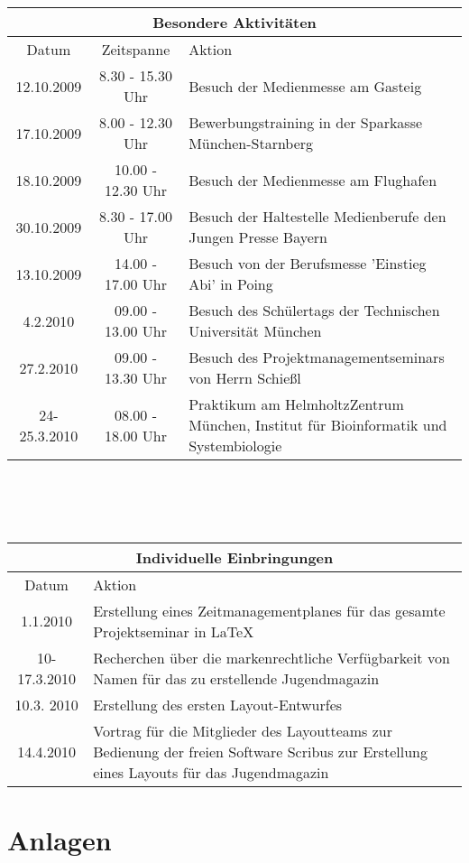 \documentclass[a4paper,12pt,twoside]{scrbook}
\begin{document}
\vspace{2cm}
\begin{tabular}{ccp{10cm}} \hline
\toprule
\multicolumn{3}{c}{\large Besondere Aktivitäten} \\\midrule
Datum & Zeitspanne & Aktion \\ \hline
12.10.2009 & 8.30 - 15.30 Uhr & Besuch der Medienmesse am Gasteig \\
17.10.2009 & 8.00 - 12.30 Uhr & Bewerbungstraining in der Sparkasse München-Starnberg \\
18.10.2009 & 10.00 - 12.30 Uhr & Besuch der Medienmesse am Flughafen\\ 
30.10.2009 & 8.30 - 17.00 Uhr & Besuch der Haltestelle Medienberufe den Jungen Presse Bayern \\
13.10.2009 & 14.00 - 17.00 Uhr & Besuch von der Berufsmesse 'Einstieg Abi' in Poing \\ 
4.2.2010 & 09.00 - 13.00 Uhr & Besuch des Schülertags der Technischen Universität München \\
27.2.2010 & 09.00 - 13.30 Uhr & Besuch des Projektmanagementseminars von Herrn Schießl\\
24-25.3.2010 & 08.00 - 18.00 Uhr & Praktikum am HelmholtzZentrum München, Institut für Bioinformatik und Systembiologie\\
\end{tabular}\\\\\

\vspace{1cm}

\begin{tabular}{cp{12cm}} \hline
\toprule
\multicolumn{2}{c}{\large Individuelle Einbringungen} \\\midrule
Datum & Aktion \\ \hline
1.1.2010 & Erstellung eines Zeitmanagementplanes für das gesamte Projektseminar in \LaTeX\\
10-17.3.2010 & Recherchen über die markenrechtliche Verfügbarkeit von Namen für das zu erstellende Jugendmagazin\\
10.3. 2010 & Erstellung des ersten Layout-Entwurfes\\
14.4.2010& Vortrag für die Mitglieder des Layoutteams zur Bedienung der freien Software Scribus zur Erstellung eines Layouts für das Jugendmagazin
\end{tabular}
\chapter{Anlagen}











\end{document}

